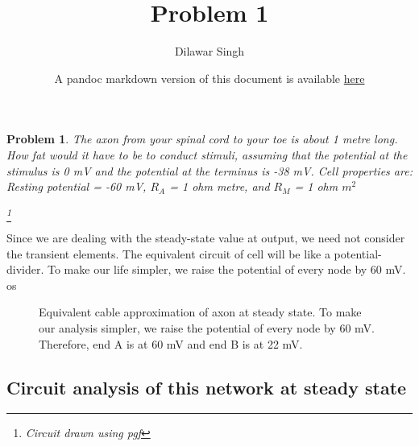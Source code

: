 \documentclass[]{article}
\title{Problem 1}
\author{Dilawar Singh}
\date{A pandoc markdown version of this document is available
\href{http://github.com/dilawar/courses/raw/master/NeuroCourse/Assignments/Second/Problem01/L2_Q1_DilawarSingh.pandoc}{here}}
\newtheorem{problem}{Problem}
\begin{document}
\maketitle

\begin{problem}
 The axon from your spinal cord to your toe is about 1 metre long. How fat
 would it have to be to conduct stimuli, assuming that the potential at the
 stimulus is 0 mV and the potential at the terminus is -38 mV. Cell properties
 are: Resting potential = -60 mV, $R_A$ = 1 ohm metre, and $R_M$ = 1 ohm $m^2$

 \footnote{Circuit drawn using pgf \pgfversion}

\end{problem}

Since we are dealing with the steady-state value at output, we need not
consider the transient elements. The equivalent circuit of cell will be
like a potential-divider. To make our life simpler, we raise the
potential of every node by 60 mV. os

\begin{figure}[h!]
\usetikzlibrary{circuits.ee.IEC}
\usetikzlibrary{shapes}
\centering
{}

\caption{\small Equivalent cable approximation of axon at steady state. To make
    our analysis simpler, we raise the potential of every node by 60 mV.
    Therefore, end A is at 60 mV and end B is at 22 mV. 
}
\end{figure}

\subsection{Circuit analysis of this network at steady
state}\label{circuit-analysis-of-this-network-at-steady-state}
\end{document}
